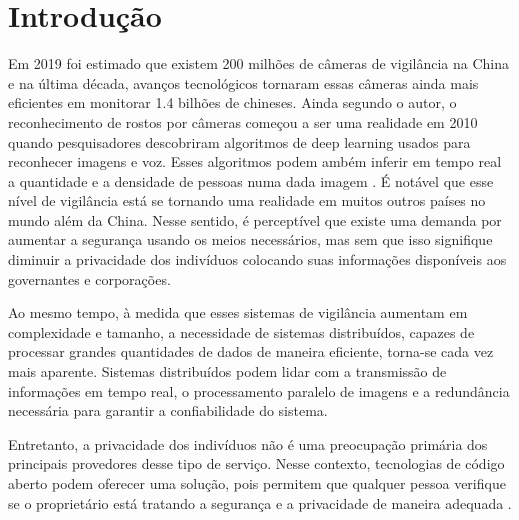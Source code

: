 \documentclass[12pt, %
openright, 
oneside, %
a4paper,    %
brazil]{facom-ufu-abntex2}
\begin{document}
\tableofcontents*
\cleardoublepage

\textual


\chapter[Introdução]{Introdução}
Em 2019 foi estimado que existem 200 milhões de câmeras de vigilância na China
e na última década, avanços tecnológicos tornaram essas câmeras ainda mais
eficientes em monitorar 1.4 bilhões de chineses. Ainda segundo o autor, o
reconhecimento de rostos por câmeras começou a ser uma realidade em 2010 quando
pesquisadores descobriram algoritmos de deep learning usados para reconhecer
imagens e voz. Esses algoritmos podem ambém inferir em tempo real a quantidade
e a densidade de pessoas numa dada imagem \cite{qiang2019road}. É notável que
esse nível de vigilância está se tornando uma realidade em muitos outros países
no mundo além da China. Nesse sentido, é perceptível que existe uma demanda por
aumentar a segurança usando os meios necessários, mas sem que isso signifique
diminuir a privacidade dos indivíduos colocando suas informações disponíveis
aos governantes e corporações.

Ao mesmo tempo, à medida que esses sistemas de vigilância aumentam em
complexidade e tamanho, a necessidade de sistemas distribuídos, capazes de
processar grandes quantidades de dados de maneira eficiente, torna-se cada vez
mais aparente. Sistemas distribuídos podem lidar com a transmissão de
informações em tempo real, o processamento paralelo de imagens e a redundância
necessária para garantir a confiabilidade do sistema.

Entretanto, a privacidade dos indivíduos não é uma preocupação primária dos
principais provedores desse tipo de serviço. Nesse contexto, tecnologias de
código aberto podem oferecer uma solução, pois permitem que qualquer pessoa
verifique se o proprietário está tratando a segurança e a privacidade de
maneira adequada \cite{mardjan2016open}.
\end{document}
